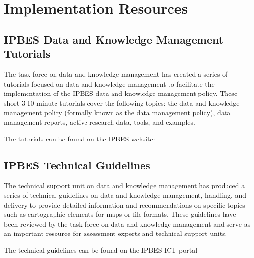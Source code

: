 \documentclass{article}
\begin{document}
\section{Implementation Resources}

\subsection{IPBES Data and Knowledge Management Tutorials}

The task force on data and knowledge management has created a series of tutorials focused on data and knowledge management to facilitate the implementation of the IPBES data and knowledge management policy. These short 3-10 minute tutorials cover the following topics: the data and knowledge management policy (formally known as the data management policy), data management reports, active research data, tools, and examples.

The tutorials can be found on the IPBES website:

\subsection{IPBES Technical Guidelines}

The technical support unit on data and knowledge management has produced a series of technical guidelines on data and knowledge management, handling, and delivery to provide detailed information and recommendations on specific topics such as cartographic elements for maps or file formats. These guidelines have been reviewed by the task force on data and knowledge management and serve as an important resource for assessment experts and technical support units.

The technical guidelines can be found on the IPBES ICT portal:
\end{document}
